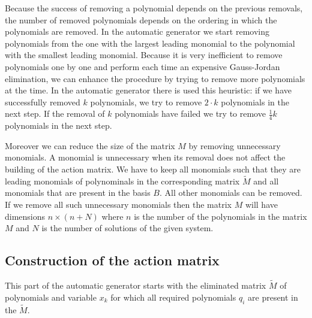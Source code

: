 Because the success of removing a polynomial depends on the previous removals, the number of removed polynomials depends on the ordering in which the polynomials are removed. In the automatic generator we start removing polynomials from the one with the largest leading monomial to the polynomial with the smallest leading monomial. Because it is very inefficient to remove polynomials one by one and perform each time an expensive Gauss-Jordan elimination, we can enhance the procedure by trying to remove more polynomials at the time. In the automatic generator there is used this heuristic: if we have successfully removed $k$ polynomials, we try to remove $2\cdot k$ polynomials in the next step. If the removal of $k$ polynomials have failed we try to remove $\frac{1}{4}k$ polynomials in the next step.

Moreover we can reduce the size of the matrix $M$ by removing unnecessary monomials. A monomial is unnecessary when its removal does not affect the building of the action matrix. We have to keep all monomials such that they are leading monomials of polynominals in the corresponding matrix $\tilde{M}$ and all monomials that are present in the basis $B$. All other monomials can be removed. If we remove all such unnecessary monomials then the matrix $M$ will have dimensions $n \times (n + N)$ where $n$ is the number of the polynomials in the matrix $M$ and $N$ is the number of solutions of the given system.

\subsection{Construction of the action matrix}
This part of the automatic generator starts with the eliminated matrix $\tilde{M}$ of polynomials and variable $x_k$ for which all required polynomials $q_i$ are present in the $\tilde{M}$.

